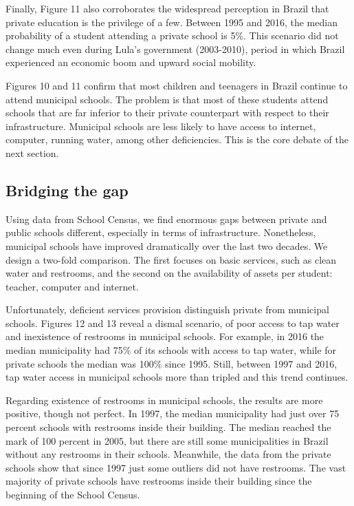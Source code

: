 \documentclass[12pt,]{article}
\begin{document}
Finally, Figure 11 also corroborates the widespread perception in Brazil
that private education is the privilege of a few. Between 1995 and 2016,
the median probability of a student attending a private school is 5\%.
This scenario did not change much even during Lula's government
(2003-2010), period in which Brazil experienced an economic boom and
upward social mobility.

Figures 10 and 11 confirm that most children and teenagers in Brazil
continue to attend municipal schools. The problem is that most of these
students attend schools that are far inferior to their private
counterpart with respect to their infrastructure. Municipal schools are
less likely to have access to internet, computer, running water, among
other deficiencies. This is the core debate of the next section.

\subsection{Bridging the gap}

Using data from School Census, we find enormous gaps between private and
public schools different, especially in terms of infrastructure.
Nonetheless, municipal schools have improved dramatically over the last
two decades. We design a two-fold comparison. The first focuses on basic
services, such as clean water and restrooms, and the second on the
availability of assets per student: teacher, computer and internet.

Unfortunately, deficient services provision distinguish private from
municipal schools. Figures 12 and 13 reveal a dismal scenario, of poor
access to tap water and inexistence of restrooms in municipal schools.
For example, in 2016 the median municipality had 75\% of its schools
with access to tap water, while for private schools the median was 100\%
since 1995. Still, between 1997 and 2016, tap water access in municipal
schools more than tripled and this trend continues.

Regarding existence of restrooms in municipal schools, the results are
more positive, though not perfect. In 1997, the median municipality had
just over 75 percent schools with restrooms inside their building. The
median reached the mark of 100 percent in 2005, but there are still some
municipalities in Brazil without any restrooms in their schools.
Meanwhile, the data from the private schools show that since 1997 just
some outliers did not have restrooms. The vast majority of private
schools have restrooms inside their building since the beginning of the
School Census.
\end{document}
